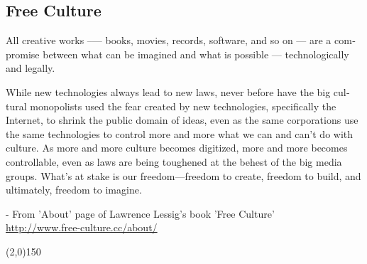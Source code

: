 \begin{english}
\section*{Free Culture}
All creative works --— books, movies, records, software, and so on --- are a compromise between what can be imagined and what is possible --- technologically and legally.

While new technologies always lead to new laws, never before have the big cultural monopolists used the fear created by new technologies, specifically the Internet, to shrink the public domain of ideas, even as the same corporations use the same technologies to control more and more what we can and can’t do with culture. As more and more culture becomes digitized, more and more becomes controllable, even as laws are being toughened at the behest of the big media groups. What’s at stake is our freedom—freedom to create, freedom to build, and ultimately, freedom to imagine.
\begin{flushright}- From 'About' page of Lawrence Lessig's book 'Free Culture'\\
\mbox{\url{http://www.free-culture.cc/about/}}\end{flushright}
\begin{center}
\line(2,0){150}
\end{center}
\end{english}
